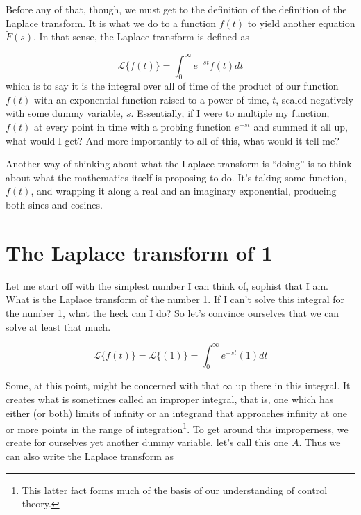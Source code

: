 \documentclass[11pt]{book}
\begin{document}
Before any of that, though, we must get to the definition of the definition of the Laplace transform. It is what we do to a function $f(t)$ to yield another equation $\tilde{F}(s)$. In that sense, the Laplace transform is defined as

\begin{equation}
	\mathcal{L}\{f(t)\} = \int_0^{\infty}e^{-st}f(t)dt
\end{equation}
which is to say it is the integral over all of time of the product of our function $f(t)$ with an exponential function raised to a power of time, $t$, scaled negatively with some dummy variable, $s$. Essentially, if I were to multiple my function, $f(t)$ at every point in time with a probing function $e^{-st}$ and summed it all up, what would I get? And more importantly to all of this, what would it tell me?

Another way of thinking about what the Laplace transform is ``doing'' is to think about what the mathematics itself is proposing to do. It's taking some function, $f(t)$, and wrapping it along a real and an imaginary exponential, producing both sines and cosines.

\section{The Laplace transform of 1}
Let me start off with the simplest number I can think of, sophist that I am. What is the Laplace transform of the number 1. If I can't solve this integral for the number 1, what the heck can I do? So let's convince ourselves that we can solve at least that much.

\begin{equation}
	\mathcal{L}\{f(t)\} = \mathcal{L}\{(1)\} = \int_0^{\infty}e^{-st}(1)dt
\end{equation}

Some, at this point, might be concerned with that $\infty$ up there in this integral. It creates what is sometimes called an improper integral, that is, one which has either (or both) limits of infinity or an integrand that approaches infinity at one or more points in the range of integration\footnote{This latter fact forms much of the basis of our understanding of control theory.}. To get around this improperness, we create for ourselves yet another dummy variable, let's call this one $A$. Thus we can also write the Laplace transform as
\end{document}
